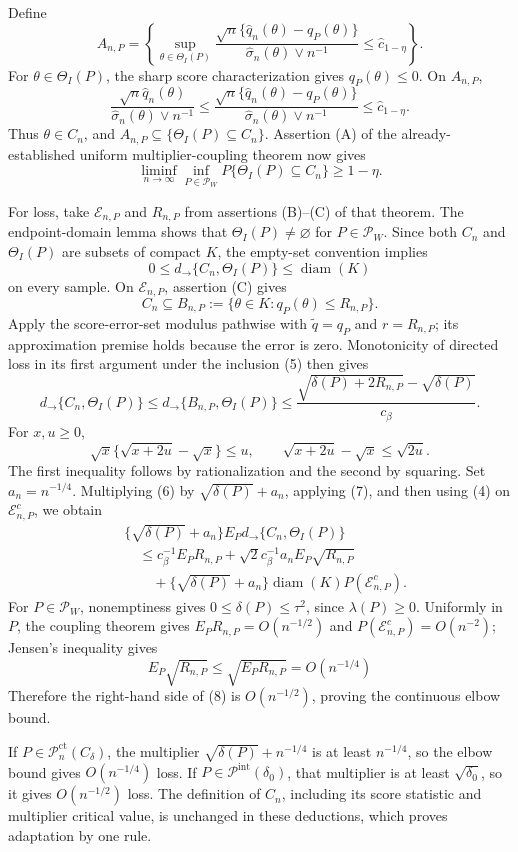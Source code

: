 Define
\[
 A_{n,P}=\left\{
 \sup_{\theta\in\Theta_I(P)}
 \frac{\sqrt n\{\widehat q_n(\theta)-q_P(\theta)\}}
 {\widehat\sigma_n(\theta)\vee n^{-1}}
 \leq\widehat c_{1-\eta}\right\}. \tag{1}
\]
For \(\theta\in\Theta_I(P)\), the sharp score characterization gives \(q_P(\theta)\leq0\). On \(A_{n,P}\),
\[
 \frac{\sqrt n\widehat q_n(\theta)}
 {\widehat\sigma_n(\theta)\vee n^{-1}}
 \leq
 \frac{\sqrt n\{\widehat q_n(\theta)-q_P(\theta)\}}
 {\widehat\sigma_n(\theta)\vee n^{-1}}
 \leq\widehat c_{1-\eta}. \tag{2}
\]
Thus \(\theta\in C_n\), and \(A_{n,P}\subseteq\{\Theta_I(P)\subseteq C_n\}\). Assertion (A) of the already-established uniform multiplier-coupling theorem now gives
\[
 \liminf_{n\to\infty}\inf_{P\in\mathcal P_W}
 P\{\Theta_I(P)\subseteq C_n\}\geq1-\eta. \tag{3}
\]

For loss, take \(\mathcal E_{n,P}\) and \(R_{n,P}\) from assertions (B)--(C) of that theorem. The endpoint-domain lemma shows that \(\Theta_I(P)\neq\varnothing\) for \(P\in\mathcal P_W\). Since both \(C_n\) and \(\Theta_I(P)\) are subsets of compact \(K\), the empty-set convention implies
\[
 0\leq d_{\to}\{C_n,\Theta_I(P)\}\leq\operatorname{diam}(K) \tag{4}
\]
on every sample. On \(\mathcal E_{n,P}\), assertion (C) gives
\[
 C_n\subseteq B_{n,P}:=\{\theta\in K:q_P(\theta)\leq R_{n,P}\}. \tag{5}
\]
Apply the score-error-set modulus pathwise with \(\widetilde q=q_P\) and \(r=R_{n,P}\); its approximation premise holds because the error is zero. Monotonicity of directed loss in its first argument under the inclusion (5) then gives
\[
 d_{\to}\{C_n,\Theta_I(P)\}
 \leq d_{\to}\{B_{n,P},\Theta_I(P)\}
 \leq\frac{\sqrt{\delta(P)+2R_{n,P}}-\sqrt{\delta(P)}}{c_\beta}. \tag{6}
\]
For \(x,u\geq0\),
\[
 \sqrt x\{\sqrt{x+2u}-\sqrt x\}\leq u,
 \qquad
 \sqrt{x+2u}-\sqrt x\leq\sqrt{2u}. \tag{7}
\]
The first inequality follows by rationalization and the second by squaring. Set \(a_n=n^{-1/4}\). Multiplying (6) by \(\sqrt{\delta(P)}+a_n\), applying (7), and then using (4) on \(\mathcal E_{n,P}^c\), we obtain
\[
 \begin{aligned}
 &\{\sqrt{\delta(P)}+a_n\}
 E_Pd_{\to}\{C_n,\Theta_I(P)\}\\
 &\quad\leq c_\beta^{-1}E_PR_{n,P}
 +\sqrt2c_\beta^{-1}a_nE_P\sqrt{R_{n,P}}\\
 &\qquad
 +\{\sqrt{\delta(P)}+a_n\}\operatorname{diam}(K)
 P(\mathcal E_{n,P}^c). \tag{8}
 \end{aligned}
\]
For \(P\in\mathcal P_W\), nonemptiness gives \(0\leq\delta(P)\leq\tau^2\), since \(\lambda(P)\geq0\). Uniformly in \(P\), the coupling theorem gives \(E_PR_{n,P}=O(n^{-1/2})\) and \(P(\mathcal E_{n,P}^c)=O(n^{-2})\); Jensen's inequality gives
\[
 E_P\sqrt{R_{n,P}}\leq\sqrt{E_PR_{n,P}}=O(n^{-1/4})
\]
Therefore the right-hand side of (8) is \(O(n^{-1/2})\), proving the continuous elbow bound.

If \(P\in\mathcal P_n^{\mathrm{ct}}(C_\delta)\), the multiplier \(\sqrt{\delta(P)}+n^{-1/4}\) is at least \(n^{-1/4}\), so the elbow bound gives \(O(n^{-1/4})\) loss. If \(P\in\mathcal P^{\mathrm{int}}(\delta_0)\), that multiplier is at least \(\sqrt{\delta_0}\), so it gives \(O(n^{-1/2})\) loss. The definition of \(C_n\), including its score statistic and multiplier critical value, is unchanged in these deductions, which proves adaptation by one rule.
